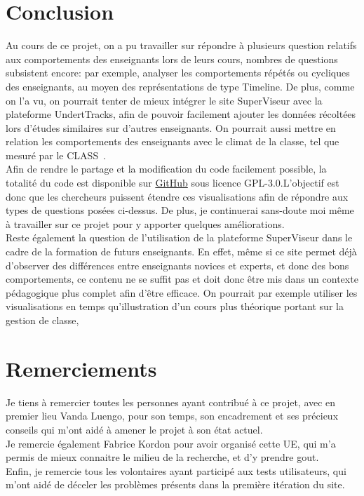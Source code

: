 \documentclass{article}
\begin{document}
\section{Conclusion}
Au cours de ce projet, on a pu travailler sur répondre à plusieurs question relatifs aux comportements des enseignants lors de leurs cours, nombres de questions subsistent encore: par exemple, analyser les comportements répétés ou cycliques des enseignants, au moyen des représentations de type Timeline. De plus, comme on l'a vu, on pourrait tenter de mieux intégrer le site SuperViseur avec la plateforme UndertTracks, afin de pouvoir facilement ajouter les données récoltées lors d'études similaires sur d'autres enseignants. On pourrait aussi mettre en relation les comportements des enseignants avec le climat de la classe, tel que mesuré par le CLASS~\cite{CLASS}.\\
Afin de rendre le partage et la modification du code facilement possible, la totalité du code est disponible sur \href{https://github.com/Vertmo/SuperViseur}{GitHub} sous licence GPL-3.0.L'objectif est donc que les chercheurs puissent étendre ces visualisations afin de répondre aux types de questions posées ci-dessus. De plus, je continuerai sans-doute moi même à travailler sur ce projet pour y apporter quelques améliorations.\\
Reste également la question de l'utilisation de la plateforme SuperViseur dans le cadre de la formation de futurs enseignants. En effet, même si ce site permet déjà d'observer des différences entre enseignants novices et experts, et donc des bons comportements, ce contenu ne se suffit pas et doit donc être mis dans un contexte pédagogique plus complet afin d'être efficace. On pourrait par exemple utiliser les visualisations en temps qu'illustration d'un cours plus théorique portant sur la gestion de classe, 

\section{Remerciements}
Je tiens à remercier toutes les personnes ayant contribué à ce projet, avec en premier lieu Vanda Luengo, pour son temps, son encadrement et ses précieux conseils qui m'ont aidé à amener le projet à son état actuel.\\
Je remercie également Fabrice Kordon pour avoir organisé cette UE, qui m'a permis de mieux connaitre le milieu de la recherche, et d'y prendre gout.\\
Enfin, je remercie tous les volontaires ayant participé aux tests utilisateurs, qui m'ont aidé de déceler les problèmes présents dans la première itération du site.

{}

\end{document}
